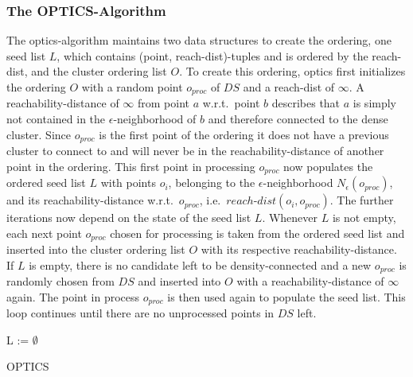 \subsubsection*{The OPTICS-Algorithm} %
The \gls{optics}-algorithm maintains two data structures to create the ordering, one seed list $L$, which contains (point, reach-dist)-tuples and is ordered by the reach-dist, and the cluster ordering list $O$. 
To create this ordering, \gls{optics} first initializes the ordering $O$ with a random point $o_{proc}$ of $DS$ and a reach-dist of $\infty$. A reachability-distance of $\infty$ from point $a$ w.r.t.\ point $b$ describes that $a$  is simply not contained in the $\epsilon$-neighborhood of $b$ and therefore connected to the dense cluster. Since $o_{proc}$ is the first point of the ordering it does not have a previous cluster to connect to and will never be in the reachability-distance of another point in the ordering. This first point in processing $o_{proc}$ now populates the ordered seed list $L$ with points $o_i$, belonging to the $\epsilon$-neighborhood $N_\epsilon(o_{proc})$, and its reachability-distance w.r.t.\ $o_{proc}$, i.e.\ $reach$-$dist(o_i, o_{proc})$. The further iterations now depend on the state of the seed list $L$. Whenever $L$ is not empty, each next point $o_{proc}$ chosen for processing is taken from the ordered seed list and inserted into the cluster ordering list $O$ with its respective reachability-distance. If $L$ is empty, there is no candidate left to be density-connected and a new $o_{proc}$ is randomly chosen from $DS$ and inserted into $O$ with a reachability-distance of $\infty$ again. The point in process $o_{proc}$ is then used again to populate the seed list. This loop continues until there are no unprocessed points in $DS$ left.

\vspace{5mm}

\begin{algorithm}[H]
\SetAlgoLined
{}
 L := $\emptyset$\;
 \caption{OPTICS}
\end{algorithm}
\vspace{5mm}

